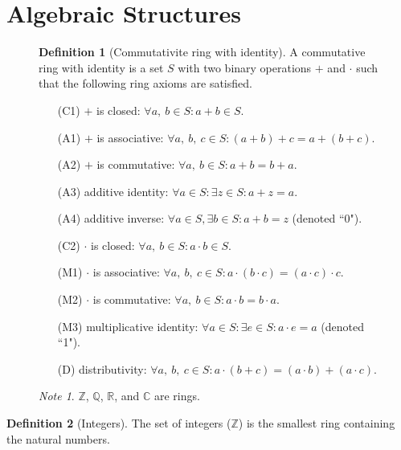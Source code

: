 \documentclass{article}
\newcommand*{\Z}{\mathbb{Z}}
\newcommand*{\Q}{\mathbb{Q}}
\newcommand*{\R}{\mathbb{R}}
\newcommand*{\C}{\mathbb{C}}
\theoremstyle{plain}
\numberwithin{theorem}{subsection}
\theoremstyle{definition}
\newtheorem{definition}{Definition}[section]
\numberwithin{definition}{subsection}
\theoremstyle{remark}
\newtheorem{note}{Note}[section]
\numberwithin{note}{subsection}
\begin{document}
\section{Algebraic Structures}
\begin{figure}[H]
	\begin{mdframed}[style=exampledefault,frametitle={Ring Axioms}]
		\begin{definition}[Commutativite ring with identity]
			A commutative ring with identity is a set $S$ with two binary operations $+$ and $\cdot$ such that the following ring axioms are satisfied.
		\end{definition}
		\begin{enumerate}[leftmargin=3.5em, itemsep=0.2em, topsep=0.35em]
			\item[(C1)] $+$ is closed: $\forall a,\:b \in S: a+b \in S$.
			\item[(A1)] $+$ is associative: $\forall a,\:b,\:c \in S: (a+b)+c = a+(b+c)$.
			\item[(A2)] $+$ is commutative: $\forall a,\:b \in S: a+b=b+a$.
			\item[(A3)] additive identity: $\forall a\in S:\exists z \in S:a+z=a$.
			\item[(A4)] additive inverse: $\forall a \in S, \exists b\in S: a+b = z$ (denoted ``0").
			\item[(C2)] $\cdot$ is closed: $\forall a,\:b \in S: a \cdot b \in S$.
			\item[(M1)] $\cdot$ is associative: $\forall a,\:b,\:c \in S:a \cdot (b \cdot c) = (a \cdot c) \cdot c$.
			\item[(M2)] $\cdot$ is commutative: $\forall a,\:b \in S:a \cdot b = b \cdot a$.
			\item[(M3)] multiplicative identity: $\forall a \in S:\exists e \in S:a \cdot e = a$ (denoted ``1").
			\item[(D)] distributivity: $\forall a,\:b,\:c \in S: a \cdot (b + c) = (a \cdot b) + (a \cdot c)$.
		\end{enumerate}
	\end{mdframed}
	\begin{note}
		$\Z$, $\Q$, $\R$, and $\C$ are rings.
	\end{note}
\end{figure}
%
\begin{definition}[Integers]
    The set of integers ($\Z$) is the smallest ring containing the natural numbers.
\end{definition}
\end{document}
